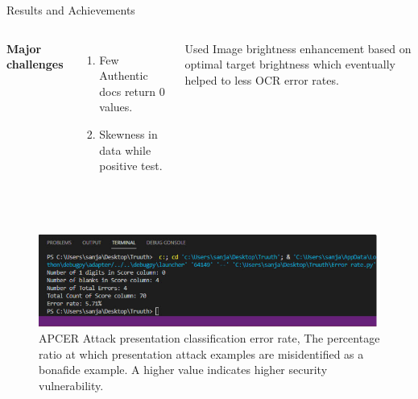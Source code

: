\documentclass[aspectratio=169,xcolor=dvipsnames]{beamer}
\begin{document}
\begin{frame}{Results and Achievements}
    \tableofcontents
    \begin{columns}[c] %

        \textbf{Major challenges}
        \begin{enumerate}
            \item Few Authentic docs return 0 values.
            \item Skewness in data while positive test.
        
        \end{enumerate}

         Used Image brightness enhancement based on optimal target brightness which eventually helped to less OCR error rates.

    \end{columns}   \\

  \begin{figure}
   \includegraphics[width=420]{error.jpg}
      \caption{APCER Attack presentation classification error rate, The percentage ratio at which presentation attack examples are misidentified as a bonafide example. A higher value indicates higher security vulnerability.}
\end{figure}

\end{frame}
\end{document}
